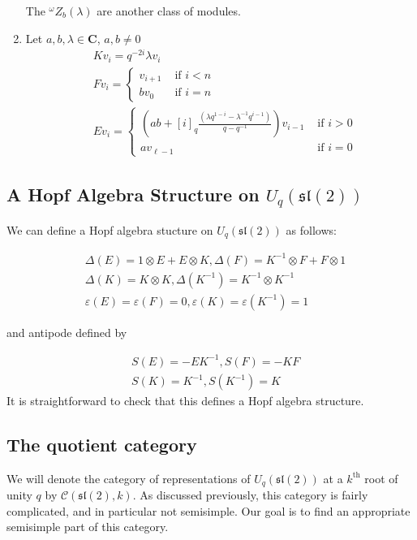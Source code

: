 \documentclass[]{article}
\begin{document}
\begin{enumerate}
    The $^\omega Z_b(\lambda)$ are another class of modules.
\item Let $a,b,\lambda \in \mathbf{C}$, $a,b\neq 0$
\begin{align*}
    &K v_i = q^{-2i} \lambda v_i \\
    &F v_i = \begin{cases} 
                v_{i+1}& \text{ if $i < n$} \\  
                b v_0& \text{ if $i = n$} 
             \end{cases}  \\
    &E v_i = \begin{cases} 
                \left(ab + [i]_q \frac{(\lambda q^{1-i} - \lambda^{-1} q^{i-1})}{q - q^{-1}}\right) v_{i-1}& \text{ if $i > 0$} \\ 
                a v_{\ell - 1}& \text{ if $i = 0$} 
             \end{cases} 
\end{align*}
\end{enumerate}
\subsection{A Hopf Algebra Structure on $U_q(\mathfrak{sl}(2))$}

We can define a Hopf algebra stucture on $U_q(\mathfrak{sl}(2))$ as follows:

\begin{align}
    &\Delta(E) = 1 \otimes E + E \otimes K, \Delta(F) = K^{-1} \otimes F + F \otimes 1 \\
    &\Delta(K) = K \otimes K, \Delta(K^{-1}) = K^{-1} \otimes K^{-1}\\ 
    &\varepsilon(E) = \varepsilon(F) = 0, \varepsilon(K) = \varepsilon(K^{-1}) = 1
\end{align}

and antipode defined by 

\begin{align}
    & S(E) = -EK^{-1}, S(F) = -KF \\
    & S(K) = K^{-1}, S(K^{-1}) = K 
\end{align}
It is straightforward to check that this defines a Hopf algebra structure. 

\subsection{The quotient category}
We will denote the category of representations of $U_q(\mathfrak{sl}(2))$ at a
$k^\text{th}$ root of unity $q$ by $\mathcal{C}(\mathfrak{sl}(2), k)$. As
discussed previously, this category is fairly complicated, and in particular
not semisimple. Our goal is to find an appropriate semisimple part of this
category.
\end{document}
